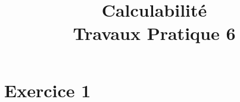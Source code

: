 \documentclass[a4paper,11pt,onecolumn]{article}
\title{Calculabilité\\Travaux Pratique 6}
\date{}
\begin{document}
\maketitle

\section*{Exercice 1}
\end{document}
